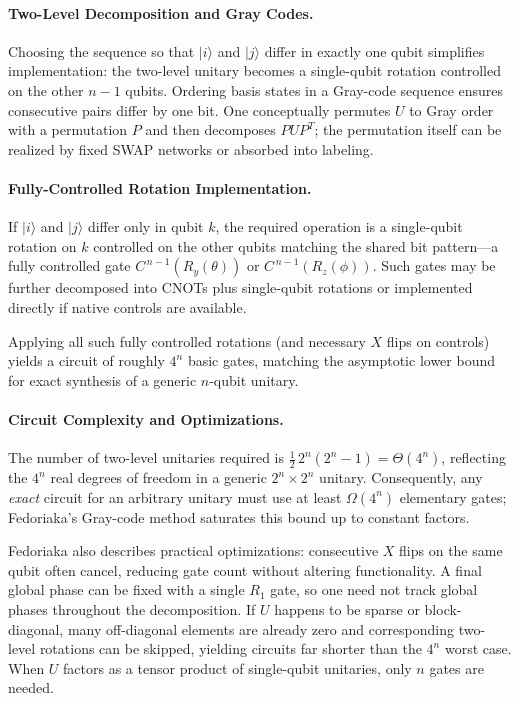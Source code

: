 \paragraph{Two-Level Decomposition and Gray Codes.}  
Choosing the sequence so that $|i\rangle$ and $|j\rangle$ differ in exactly one qubit simplifies implementation: the two-level unitary becomes a single-qubit rotation controlled on the other $n\!-\!1$ qubits.\cite{Barenco1995elementary} Ordering basis states in a Gray-code sequence ensures consecutive pairs differ by one bit.\cite{Bullock2004gray} One conceptually permutes $U$ to Gray order with a permutation $P$ and then decomposes $PUP^T$; the permutation itself can be realized by fixed SWAP networks or absorbed into labeling.\cite{Bullock2004gray}

\paragraph{Fully-Controlled Rotation Implementation.}  
If $|i\rangle$ and $|j\rangle$ differ only in qubit $k$, the required operation is a single-qubit rotation on $k$ controlled on the other qubits matching the shared bit pattern—a fully controlled gate $C^{\,n-1}(R_y(\theta))$ or $C^{\,n-1}(R_z(\phi))$.\cite{fedoriaka2025decomposition} Such gates may be further decomposed into CNOTs plus single-qubit rotations or implemented directly if native controls are available.\cite{Barenco1995elementary}

Applying all such fully controlled rotations (and necessary $X$ flips on controls) yields a circuit of roughly $4^{n}$ basic gates, matching the asymptotic lower bound for exact synthesis of a generic $n$-qubit unitary.\cite{Shende2006synthesis}

\paragraph{Circuit Complexity and Optimizations.}  
The number of two-level unitaries required is $\tfrac12\,2^{n}(2^{n}-1)=\Theta(4^{n})$, reflecting the $4^{n}$ real degrees of freedom in a generic $2^{n}\!\times\!2^{n}$ unitary.\cite{Shende2006synthesis} Consequently, any \emph{exact} circuit for an arbitrary unitary must use at least $\Omega(4^{n})$ elementary gates; Fedoriaka’s Gray-code method saturates this bound up to constant factors.\cite{fedoriaka2025decomposition}

Fedoriaka also describes practical optimizations: consecutive $X$ flips on the same qubit often cancel, reducing gate count without altering functionality.\cite{fedoriaka2025decomposition} A final global phase can be fixed with a single $R_1$ gate, so one need not track global phases throughout the decomposition.\cite{Reck1994optics}  
If $U$ happens to be sparse or block-diagonal, many off-diagonal elements are already zero and corresponding two-level rotations can be skipped, yielding circuits far shorter than the $4^{n}$ worst case.\cite{Bullock2004gray} When $U$ factors as a tensor product of single-qubit unitaries, only $n$ gates are needed.\cite{Barenco1995elementary}

